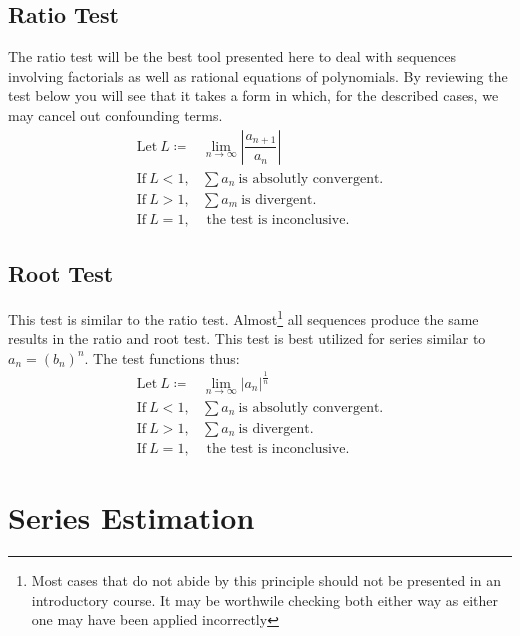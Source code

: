 \documentclass[11pt]{scrreprt}
\newcommand{\define}{\coloneqq}
\newcommand{\abs}[1]{\left| #1 \right|}
\begin{document}
	\subsection*{Ratio Test}
		The ratio test will be the best tool presented here to deal with sequences involving factorials as well as rational equations of polynomials.
		By reviewing the test below you will see that it takes a form in which, for the described cases, we may cancel out confounding terms.
			\begin{align}
				\text{Let} \ L \define &\lim_{n\to\infty} \abs{\dfrac{a_{n+1}}{a_n}} \\
				\text{If} \ L < 1, &\sum a_n \ \text{is absolutly convergent.} \\
				\text{If} \ L > 1, &\sum a_m \ \text{is divergent.} \\
				\text{If} \ L = 1, &\text{ the test is inconclusive.}
			\end{align}

	\subsection*{Root Test}
		This test is similar to the ratio test. Almost\footnote{Most cases that do not abide by this principle should not be presented
		in an introductory course. It may be worthwile checking both either way as either one may have been applied incorrectly} 
		all sequences produce the same results in the ratio and root test. This test is best utilized for series similar to
		$a_n = (b_n)^n$. The test functions thus:
			\begin{align}
				\text{Let} \ L \define &\lim_{n\to\infty} \abs{a_n}^{\frac{1}{n}} \\
				\text{If} \ L < 1, &\sum a_n \ \text{is absolutly convergent.} \\
				\text{If} \ L > 1, &\sum a_n \ \text{is divergent.} \\
				\text{If} \ L = 1, &\text{ the test is inconclusive.}
			\end{align}

\section*{Series Estimation}
\end{document}
